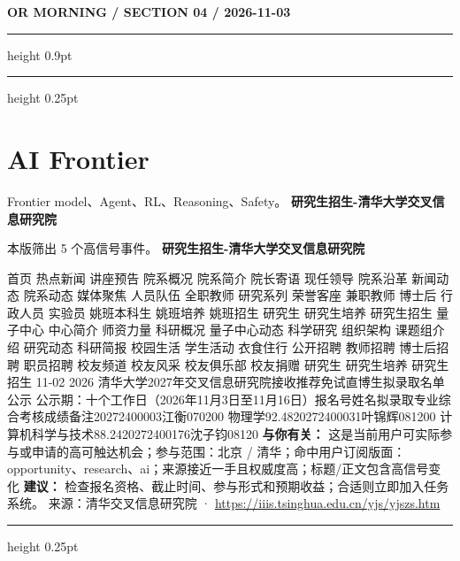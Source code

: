 \documentclass[10.5pt]{ctexart}
\begin{document}
\newpage
{\small\bfseries OR MORNING / SECTION 04 / 2026-11-03}
\vspace{2mm}
\hrule height 0.9pt
\vspace{1.5mm}
\hrule height 0.25pt
\vspace{4mm}
\section*{AI Frontier}
{\color{ormuted} Frontier model、Agent、RL、Reasoning、Safety。}
\vspace{2mm}
{\LARGE\bfseries 研究生招生-清华大学交叉信息研究院}\par
\vspace{1mm}
{\color{ormuted} 本版筛出 5 个高信号事件。}
\vspace{3mm}
{\Large\bfseries 研究生招生-清华大学交叉信息研究院}\par
首页 热点新闻 讲座预告 院系概况 院系简介 院长寄语 现任领导 院系沿革 新闻动态 院系动态 媒体聚焦 人员队伍 全职教师 研究系列 荣誉客座 兼职教师 博士后 行政人员 实验员 姚班本科生 姚班培养 姚班招生 研究生 研究生培养 研究生招生 量子中心 中心简介 师资力量 科研概况 量子中心动态 科学研究 组织架构 课题组介绍 研究动态 科研简报 校园生活 学生活动 衣食住行 公开招聘 教师招聘 博士后招聘 职员招聘 校友频道 校友风采 校友俱乐部 校友捐赠 研究生 研究生培养 研究生招生 11-02 2026 清华大学2027年交叉信息研究院接收推荐免试直博生拟录取名单公示 公示期：十个工作日（2026年11月3日至11月16日）报名号姓名拟录取专业综合考核成绩备注20272400003江衡070200 物理学92.4820272400031叶锦辉081200 计算机科学与技术88.2420272400176沈子钧08120
\textbf{与你有关：} 这是当前用户可实际参与或申请的高可触达机会；参与范围：北京 / 清华；命中用户订阅版面：opportunity、research、ai；来源接近一手且权威度高；标题/正文包含高信号变化
\textbf{建议：} 检查报名资格、截止时间、参与形式和预期收益；合适则立即加入任务系统。
{\footnotesize\color{ormuted} 来源：清华交叉信息研究院 · \url{https://iiis.tsinghua.edu.cn/yjs/yjszs.htm}}
\vspace{4mm}
\hrule height 0.25pt
\vspace{3mm}
\end{document}
